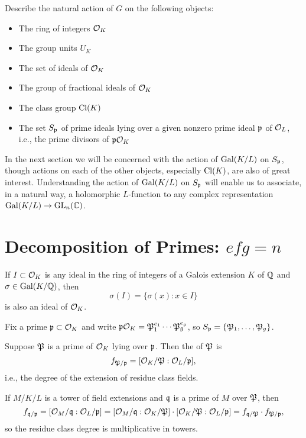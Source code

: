 \begin{exercise}
	Describe the natural action of $G$ on the following objects:
	\begin{itemize}
		\item The ring of integers $\O_K$
		\item The group units $U_K$
		\item The set of ideals of $\O_K$
		\item The group of fractional ideals of $\O_K$
		\item The class group $\Cl(K)$
		\item The set $S_\p$ of prime ideals lying over a given nonzero
	prime ideal $\p$ of $\O_L$, i.e., the prime divisors of $\p\O_K$
	\end{itemize}
\end{exercise}

In the next section we will be concerned with the action of
$\Gal(K/L)$ on $S_\p$, though actions on each of the other objects,
especially $\Cl(K)$, are also of great interest.  Understanding the
action of $\Gal(K/L)$ on $S_{\p}$ will enable us to associate, in a
natural way, a holomorphic $L$-function to any complex representation
$\Gal(K/L) \to \GL_n(\C)$.

\section{Decomposition of Primes: $efg=n$}
If $I\subset \O_K$ is any ideal in the ring of integers of
a Galois extension $K$ of $\Q$ and $\sigma\in\Gal(K/\Q)$, then
$$
  \sigma(I) = \{\sigma(x) : x \in I\}
$$
is also an ideal of $\O_K$.


Fix a prime $\p\subset \O_K$ and write $\p\O_K = \P_1^{e_1}\cdots
\P_g^{e_g}$, so $S_\p=\{\P_1,\ldots, \P_g\}$.
\begin{definition}
Suppose $\P$ is a prime of $\O_K$ lying over $\p$.
Then the  of $\P$ is
$$
   f_{\P/\p} = [\O_K/\P : \O_L/\p],$$
i.e., the degree of the extension of residue class fields.
\end{definition}
If $M/K/L$ is a tower of field extensions and
$\q$ is a prime of $M$ over $\P$, then
$$f_{\q/\p} = [\O_M/\q : \O_L/\p]
=[\O_M/\q : \O_K/\P]\cdot [\O_K/\P : \O_L/\p] =
f_{\q/\P}\cdot f_{\P/\p},$$
so the residue class degree is multiplicative in
towers.


